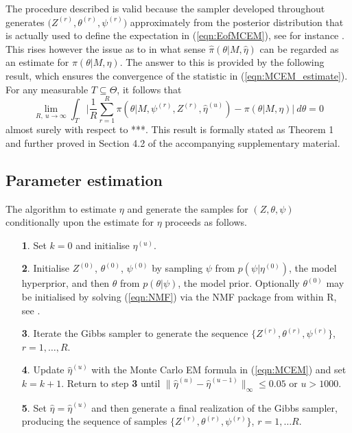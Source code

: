 \documentclass{bioinfo}
\begin{document}
The procedure described is valid because the sampler developed
throughout generates $\big(Z^{(r)}, \theta^{(r)}, \psi^{(r)}\big)$
approximately from the posterior distribution that is actually used to
define the expectation in (\ref{eqn:EofMCEM}), see for instance
\cite{FM}. This rises however the issue as to in what sense
$\hat\pi(\theta|M, \hat\eta)$ can be regarded as an estimate for
$\pi(\theta|M, \eta)$. The answer to this is provided by the following
result, which ensures the convergence of the statistic in
(\ref{eqn:MCEM_estimate}). For any measurable $T\subseteq \Theta$, it
follows that 
\[
   \lim_{R,\ u\to\infty}
     \int_T
    \bigg|
       \frac{1}{R} \sum_{r=1}^R \pi(\theta|M, \psi^{(r)}, Z^{(r)},
          \hat\eta^{(u)}) - \pi(\theta|M,\eta)
    \bigg|\ d\theta = 0
\]
almost surely with respect to ***. This result is formally stated as
Theorem 1 and further proved in Section 4.2 of the accompanying
supplementary material.





\subsection{Parameter estimation}
The algorithm to estimate $\eta$ and generate the samples for $(Z,
\theta, \psi)$ conditionally upon the estimate for $\eta$ proceeds as 
follows. 
\begin{enumerate}
\item[\textbf{1}.] Set $k = 0$ and initialise $\eta^{(u)}$.
\item[\textbf{2}.] Initialise $Z^{(0)}$, $\theta^{(0)}$, $\psi^{(0)}$
  by sampling $\psi$ from $p(\psi|\eta^{(0)})$, the model hyperprior,
  and then $\theta$ from $p(\theta|\psi)$, the model prior. Optionally
  $\theta^{(0)}$ may be initialised by solving (\ref{eqn:NMF})
  via the NMF package from within R, see \citealp{GS}. 
\item[\textbf{3}.] Iterate the Gibbs sampler to generate the sequence
 $\{Z^{(r)}, \theta^{(r)}, \psi^{(r)}\}$, $r = 1, \ldots, R$.
\item[\textbf{4}.] Update $\hat\eta^{(u)}$ with the Monte Carlo EM
formula in (\ref{eqn:MCEM}) and set $k = k+1$. Return to step
\textbf{3} until $\big\|\hat\eta^{(u)} - \hat\eta^{(u-1)}\big\|_\infty  
\leqslant 0.05$ or $u > 1000$. 
\item[\textbf{5}.] Set $\hat\eta = \hat\eta^{(u)}$ and then generate a 
  final realization of the Gibbs sampler, producing the sequence of
  samples $\{Z^{(r)}, \theta^{(r)}, \psi^{(r)}\}$, $r=1, \ldots
  R$. 
\end{enumerate}
\end{document}
